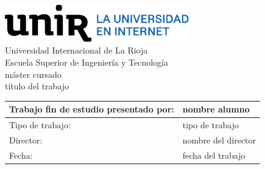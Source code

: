 \begin{titlepage}
	
	
	\centering
	\vspace{3cm}
	\includegraphics[width=0.60\textwidth]{includes/logoUnir.eps}\\	
	{\Huge Universidad Internacional de La Rioja \\}
	{\LARGE Escuela Superior de Ingeniería y Tecnología \\}
	\vspace{3cm}
	\setmainfont{Calibri Light}
	{\Large máster cursado\\}
	\setmainfont{Calibri}
	{\Huge\textcolor{blueUnir}{título del trabajo} \\}
	\vfill{}
	\def\arraystretch{1}
	\setmainfont{Calibri Light}
	\begin{tabular}{| p{8cm} | p{7cm} |}
		\arrayrulecolor{gray80}
		\hline
		Trabajo fin de estudio presentado por: & nombre alumno \\
		\hline
		Tipo de trabajo: & tipo de trabajo \\
		\hline
		Director: & nombre del director \\
		\hline
		Fecha: & fecha del trabajo \\
		\hline
	\end{tabular}
\vspace{4cm}
\end{titlepage}